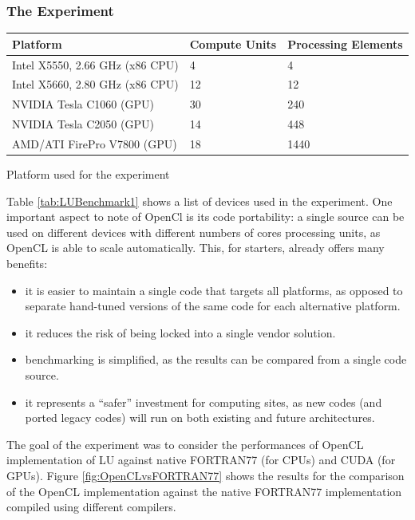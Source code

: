 \subsubsection{The Experiment}

\begin{tablehere}
{\footnotesize
\begin{tabular}{|p{}|p{}|p{}|}\hline
\textbf{Platform} & \textbf{Compute Units} & \textbf{Processing Elements} \\ \hline
Intel X5550, 2.66 GHz (x86 CPU) & 4 & 4 \\ \hline
Intel X5660, 2.80 GHz (x86 CPU) & 12 & 12 \\ \hline
NVIDIA Tesla C1060 (GPU) & 30 & 240 \\ \hline
NVIDIA Tesla C2050 (GPU) & 14 & 448 \\ \hline
AMD/ATI FirePro V7800 (GPU) & 18 & 1440 \\ \hline
\end{tabular}}
  \caption{Platform used for the experiment}
	\label{tab:LUBenchmark1}
\end{tablehere}

Table \ref{tab:LUBenchmark1} shows a list of devices used in the experiment. One important aspect to note of OpenCl is its code portability: a single source can be used on different devices with different numbers of cores processing units, as OpenCL is able to scale automatically. This, for starters, already offers many benefits:

\begin{itemize}
	\item it is easier to maintain a single code that targets all platforms, as opposed to separate hand-tuned versions of the same code for each alternative platform.
	\item it reduces the risk of being locked into a single vendor solution.
	\item benchmarking is simplified, as the results can be compared from a single code source.
	\item it represents a "`safer"' investment for computing sites, as new codes (and ported legacy codes) will run on both existing and future architectures.
\end{itemize}

The goal of the experiment was to consider the performances of OpenCL implementation of LU against native FORTRAN77 (for CPUs) and CUDA (for GPUs). Figure \ref{fig:OpenCLvsFORTRAN77} shows the results for the comparison of the OpenCL implementation against the native FORTRAN77 implementation compiled using different compilers.


